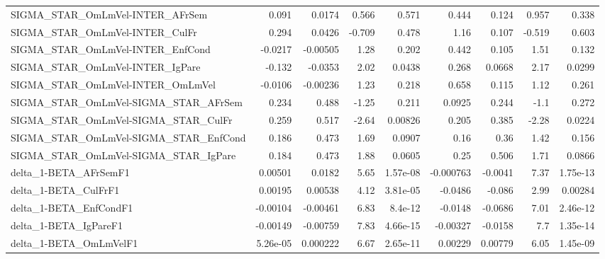 \begin{tabular}{lrrrrrrrr}
SIGMA\_STAR\_OmLmVel-INTER\_AFrSem       &       0.091 &       0.0174 &   0.566 &    0.571 &      0.444 &       0.124 &        0.957 &         0.338 \\
SIGMA\_STAR\_OmLmVel-INTER\_CulFr        &       0.294 &       0.0426 &  -0.709 &    0.478 &       1.16 &       0.107 &       -0.519 &         0.603 \\
SIGMA\_STAR\_OmLmVel-INTER\_EnfCond      &     -0.0217 &     -0.00505 &    1.28 &    0.202 &      0.442 &       0.105 &         1.51 &         0.132 \\
SIGMA\_STAR\_OmLmVel-INTER\_IgPare       &      -0.132 &      -0.0353 &    2.02 &   0.0438 &      0.268 &      0.0668 &         2.17 &        0.0299 \\
SIGMA\_STAR\_OmLmVel-INTER\_OmLmVel      &     -0.0106 &     -0.00236 &    1.23 &    0.218 &      0.658 &       0.115 &         1.12 &         0.261 \\
SIGMA\_STAR\_OmLmVel-SIGMA\_STAR\_AFrSem  &       0.234 &        0.488 &   -1.25 &    0.211 &     0.0925 &       0.244 &         -1.1 &         0.272 \\
SIGMA\_STAR\_OmLmVel-SIGMA\_STAR\_CulFr   &       0.259 &        0.517 &   -2.64 &  0.00826 &      0.205 &       0.385 &        -2.28 &        0.0224 \\
SIGMA\_STAR\_OmLmVel-SIGMA\_STAR\_EnfCond &       0.186 &        0.473 &    1.69 &   0.0907 &       0.16 &        0.36 &         1.42 &         0.156 \\
SIGMA\_STAR\_OmLmVel-SIGMA\_STAR\_IgPare  &       0.184 &        0.473 &    1.88 &   0.0605 &       0.25 &       0.506 &         1.71 &        0.0866 \\
delta\_1-BETA\_AFrSemF1                 &     0.00501 &       0.0182 &    5.65 & 1.57e-08 &  -0.000763 &     -0.0041 &         7.37 &      1.75e-13 \\
delta\_1-BETA\_CulFrF1                  &     0.00195 &      0.00538 &    4.12 & 3.81e-05 &    -0.0486 &      -0.086 &         2.99 &       0.00284 \\
delta\_1-BETA\_EnfCondF1                &    -0.00104 &     -0.00461 &    6.83 &  8.4e-12 &    -0.0148 &     -0.0686 &         7.01 &      2.46e-12 \\
delta\_1-BETA\_IgPareF1                 &    -0.00149 &     -0.00759 &    7.83 & 4.66e-15 &   -0.00327 &     -0.0158 &          7.7 &      1.35e-14 \\
delta\_1-BETA\_OmLmVelF1                &    5.26e-05 &     0.000222 &    6.67 & 2.65e-11 &    0.00229 &     0.00779 &         6.05 &      1.45e-09 \\

\end{tabular}
